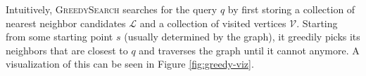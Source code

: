Intuitively, \textsc{GreedySearch} searches for the query \(q\) by first storing a collection of nearest neighbor candidates \(\mathcal{L}\) and a collection of visited vertices \(\mathcal{V}\). Starting from some starting point \(s\) (usually determined by the graph), it greedily picks its neighbors that are closest to \(q\) and traverses the graph until it cannot anymore. 
A visualization of this can be seen in Figure \ref{fig:greedy-viz}.


